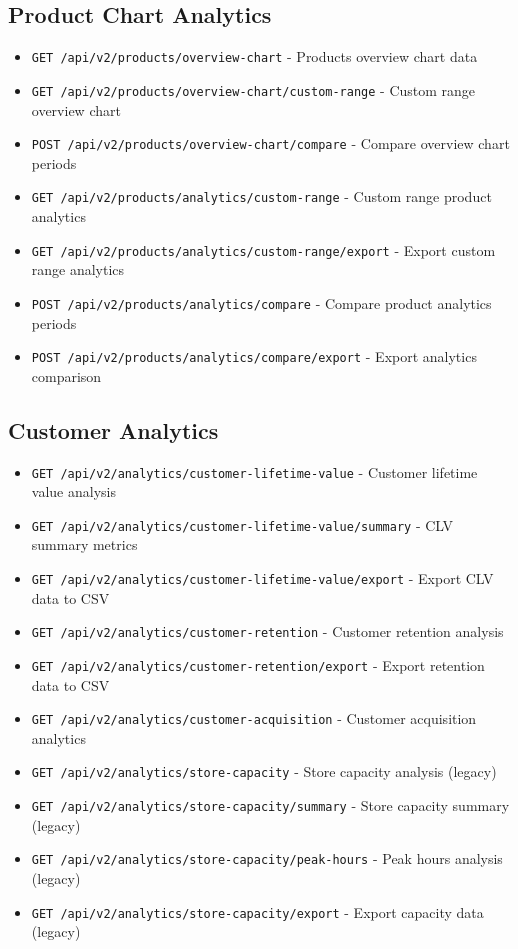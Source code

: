 \documentclass[11pt,a4paper]{article}
\begin{document}
\subsection{Product Chart Analytics}
\begin{itemize}[leftmargin=*]
    \item \texttt{GET /api/v2/products/overview-chart} - Products overview chart data
    \item \texttt{GET /api/v2/products/overview-chart/custom-range} - Custom range overview chart
    \item \texttt{POST /api/v2/products/overview-chart/compare} - Compare overview chart periods
    \item \texttt{GET /api/v2/products/analytics/custom-range} - Custom range product analytics
    \item \texttt{GET /api/v2/products/analytics/custom-range/export} - Export custom range analytics
    \item \texttt{POST /api/v2/products/analytics/compare} - Compare product analytics periods
    \item \texttt{POST /api/v2/products/analytics/compare/export} - Export analytics comparison
\end{itemize}

\subsection{Customer Analytics}
\begin{itemize}[leftmargin=*]
    \item \texttt{GET /api/v2/analytics/customer-lifetime-value} - Customer lifetime value analysis
    \item \texttt{GET /api/v2/analytics/customer-lifetime-value/summary} - CLV summary metrics
    \item \texttt{GET /api/v2/analytics/customer-lifetime-value/export} - Export CLV data to CSV
    \item \texttt{GET /api/v2/analytics/customer-retention} - Customer retention analysis
    \item \texttt{GET /api/v2/analytics/customer-retention/export} - Export retention data to CSV
    \item \texttt{GET /api/v2/analytics/customer-acquisition} - Customer acquisition analytics
    \item \texttt{GET /api/v2/analytics/store-capacity} - Store capacity analysis (legacy)
    \item \texttt{GET /api/v2/analytics/store-capacity/summary} - Store capacity summary (legacy)
    \item \texttt{GET /api/v2/analytics/store-capacity/peak-hours} - Peak hours analysis (legacy)
    \item \texttt{GET /api/v2/analytics/store-capacity/export} - Export capacity data (legacy)
\end{itemize}
\end{document}
